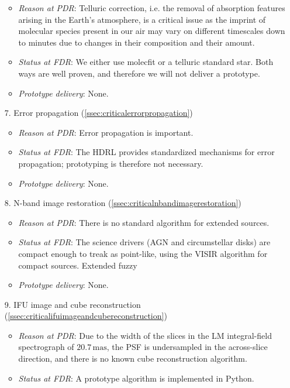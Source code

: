 \begin{enumerate}
\begin{itemize}
        \item \textit{Reason at PDR}: Telluric correction, i.e. the removal of absorption features arising in the Earth’s atmosphere, is a critical issue as the imprint of molecular species present in our air may vary on different timescales down to minutes due to changes in their composition and their amount.
        \item \textit{Status at FDR}: We either use molecfit or a telluric standard star. Both ways are well proven, and therefore we will not deliver a prototype.
        \item \textit{Prototype delivery}: None.
    \end{itemize}
    \item[7.] Error propagation (\ref{ssec:criticalerrorpropagation})
    \begin{itemize}
        \item \textit{Reason at PDR}: Error propagation is important.
        \item \textit{Status at FDR}: The \ac{HDRL} provides standardized mechanisms for error propagation; prototyping is therefore not necessary.
        \item \textit{Prototype delivery}: None.
    \end{itemize}
    \item[8.] N-band image restoration (\ref{ssec:criticalnbandimagerestoration})
    \begin{itemize}
        \item \textit{Reason at PDR}: There is no standard algorithm for extended sources.
        \item \textit{Status at FDR}: The science drivers (AGN and circumstellar disks) are compact enough to treak as point-like, using the VISIR algorithm for compact sources. Extended fuzzy 
        \item \textit{Prototype delivery}: None.
    \end{itemize}
    \item[9.] IFU image and cube reconstruction (\ref{ssec:criticalifuimageandcubereconstruction})
    \begin{itemize}
        \item \textit{Reason at PDR}: Due to the width of the slices in the LM integral-field spectrograph of $20.7\,\mathrm{mas}$,
            the PSF is undersampled in the across-slice direction, and there is no known cube reconstruction algorithm.
        \item \textit{Status at FDR}: A prototype algorithm is implemented in Python.

\end{itemize}
\end{enumerate}
